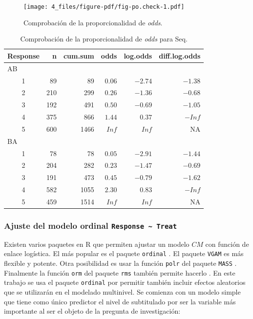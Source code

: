 \documentclass[
  12pt,
  a4paper,
  extrafontsizes,
  onecolumn,
  openright,
  table]{memoir}
\begin{document}
\begin{figure}[h]

{\centering \texttt{[image: 4\_files/figure-pdf/fig-po.check-1.pdf]}

}

\caption{\label{fig-po.check}Comprobación de la proporcionalidad de
\emph{odds}.}

\end{figure}

\hypertarget{tbl-po.check}{}
\begin{longtable}{crrrrr}
\caption{\label{tbl-po.check}Comprobación de la proporcionalidad de \emph{odds} para Seq. }\tabularnewline

\toprule
Response & n & cum.sum & odds & log.odds & diff.log.odds \\ 
\midrule
\multicolumn{6}{l}{AB} \\ 
\midrule
1 & 89 & 89 & $0.06$ & $-2.74$ & $-1.38$ \\ 
2 & 210 & 299 & $0.26$ & $-1.36$ & $-0.68$ \\ 
3 & 192 & 491 & $0.50$ & $-0.69$ & $-1.05$ \\ 
4 & 375 & 866 & $1.44$ & $0.37$ & $-Inf$ \\ 
5 & 600 & 1466 & $Inf$ & $Inf$ & NA \\ 
\midrule
\multicolumn{6}{l}{BA} \\ 
\midrule
1 & 78 & 78 & $0.05$ & $-2.91$ & $-1.44$ \\ 
2 & 204 & 282 & $0.23$ & $-1.47$ & $-0.69$ \\ 
3 & 191 & 473 & $0.45$ & $-0.79$ & $-1.62$ \\ 
4 & 582 & 1055 & $2.30$ & $0.83$ & $-Inf$ \\ 
5 & 459 & 1514 & $Inf$ & $Inf$ & NA \\ 
\bottomrule
\end{longtable}

\hypertarget{ajuste-del-modelo-ordinal-response-treat}{%
\subsubsection{\texorpdfstring{Ajuste del modelo ordinal
\texttt{Response\ \textasciitilde{}\ Treat}}{Ajuste del modelo ordinal Response \textasciitilde{} Treat}}\label{ajuste-del-modelo-ordinal-response-treat}}

Existen varios paquetes en R que permiten ajustar un modelo \(CM\) con
función de enlace logística. El más popular es el paquete
\texttt{ordinal} \autocite[ver][]{ordinalR}. El paquete \texttt{VGAM}
\autocite[ver][]{VGAMR} es más flexible y potente. Otra posibilidad es
usar la función \texttt{polr} del paquete \texttt{MASS}
\autocite[ver][]{MASSR}. Finalmente la función \texttt{orm} del paquete
\texttt{rms} también permite hacerlo \autocite[ver][]{harrell2015}. En
este trabajo se usa el paquete \texttt{ordinal}
\autocite[ver][]{ordinalR} por permitir también incluir efectos
aleatorios que se utilizarán en el modelado multinivel. Se comienza con
un modelo simple que tiene como único predictor el nivel de subtitulado
por ser la variable más importante al ser el objeto de la pregunta de
investigación:
\end{document}
